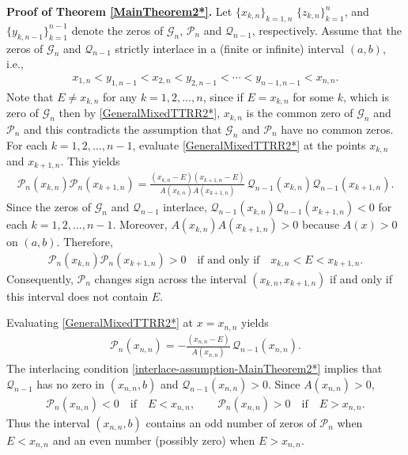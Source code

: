 \documentclass[final,3p,times,12pt]{elsarticle}
\numberwithin{equation}{section}  %
\begin{document}
\vspace{1cm}

{\bf{Proof of Theorem \ref{MainTheorem2*}.}} Let $\{x_{k,n}\}_{k=1,n}$
$\{z_{k,n}\}_{k=1}^{n}$, and $\{y_{k,n-1}\}_{k=1}^{n-1}$ denote the zeros of $\mathcal{G}_n$, $\mathcal{P}_n$ and $\mathcal{Q}_{n-1}$, respectively.
Assume that the zeros of $\mathcal{G}_{n}$ and $\mathcal{Q}_{n-1}$ strictly interlace in a (finite or infinite) interval $(a,b)$, i.e.,
\begin{align}\label{interlace-assumption-MainTheorem2*}
	x_{1,n} < y_{1,n-1} < x_{2,n} < y_{2,n-1}< \cdots < y_{n-1,n-1} < x_{n,n}.
\end{align} Note that $E\neq x_{k,n}$ for any $k=1,2,\dots,n$, since if $E=x_{k,n}$ for some $k$, which is zero of $\mathcal{G}_{n}$ then by \eqref{GeneralMixedTTRR2*}, $x_{k,n}$ is the common zero of $\mathcal{G}_{n}$ and $\mathcal{P}_n$ and this contradicts the assumption that $\mathcal{G}_{n}$ and $\mathcal{P}_n$ have no common zeros.
For each $k=1,2,\dots,n-1$, evaluate \eqref{GeneralMixedTTRR2*} at the points $x_{k,n}$ and $x_{k+1,n}$. This yields
\begin{align}\label{GeneralMixedTTRR2-Evaluateatx_kandx_k+1*}
	\mathcal{P}_n(x_{k,n})\mathcal{P}_n(x_{k+1,n})
	=\frac{(x_{k,n}-E)(x_{k+1,n}-E)}{A(x_{k,n})A(x_{k+1,n})}\,\mathcal{Q}_{n-1}(x_{k,n})\mathcal{Q}_{n-1}(x_{k+1,n}).
\end{align}
Since the zeros of $\mathcal{G}_n$ and $\mathcal{Q}_{n-1}$ interlace, 
$\mathcal{Q}_{n-1}(x_{k,n})\mathcal{Q}_{n-1}(x_{k+1,n}) < 0$ 
for each $k=1,2,\dots,n-1$. 
Moreover, $A(x_{k,n})A(x_{k+1,n}) > 0$ because $A(x)>0$ on $(a,b)$. 
Therefore,
\begin{align}\label{Thm2-NS condition-sign-Pn-interval*}
	\mathcal{P}_n(x_{k,n})\mathcal{P}_n(x_{k+1,n}) > 0
	\quad \text{if and only if} \quad 
	x_{k,n} < E < x_{k+1,n}.
\end{align}
Consequently, $\mathcal{P}_n$ changes sign across the interval $(x_{k,n},x_{k+1,n})$ if and only if this interval does not contain $E$.



Evaluating \eqref{GeneralMixedTTRR2*} at $x = x_{n,n}$ yields
\begin{align}\label{GeneralMixedTTRR2-at-x_nn*}
	\mathcal{P}_n(x_{n,n}) = -\frac{(x_{n,n}-E)}{A(x_{n,n})}\,\mathcal{Q}_{n-1}(x_{n,n}).
\end{align}
The interlacing condition \eqref{interlace-assumption-MainTheorem2*} implies that $\mathcal{Q}_{n-1}$ has no zero in $(x_{n,n},b)$ and $\mathcal{Q}_{n-1}(x_{n,n}) > 0$. Since $A(x_{n,n}) > 0$, 
\begin{align*}
	\mathcal{P}_n(x_{n,n}) < 0 \quad \text{if} \quad E < x_{n,n}, \qquad 
	\mathcal{P}_n(x_{n,n}) > 0 \quad \text{if} \quad E > x_{n,n}.
\end{align*}
Thus the interval $(x_{n,n},b)$ contains an odd number of zeros of $\mathcal{P}_n$ when $E < x_{n,n}$ and an even number (possibly zero) when $E > x_{n,n}$.
\end{document}
